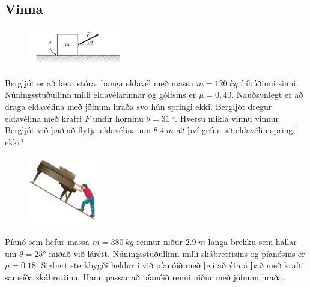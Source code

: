 \begin{enumerate}[label = \textbf{Dæmi \thechapter.\arabic*.}]


\subsection*{Vinna}

\begin{minipage}{\linewidth}
\begin{figure}
\vspace{-0.5cm}
\includegraphics[width=1.7in]{images/beggatwerk.png}
\end{figure}
    
    \item Bergljót er að færa stóra, þunga eldavél með massa $m = \SI{120}{kg}$ í íbúðinni sinni. Núningsstuðullinn milli eldavélarinnar og gólfsins er $\mu = 0,40$. Nauðsynlegt er að draga eldavélina með jöfnum hraða svo hún springi ekki. Bergljót dregur eldavélina með krafti $F$ undir horninu $\theta = \SI{31}{\degree}$. Hversu mikla vinnu vinnur Bergljót við það að flytja eldavélina um $\SI{8,4}{m}$ að því gefnu að eldavélin springi ekki?
    
\end{minipage}
    
\begin{minipage}{\linewidth}
\begin{figure}
\includegraphics[width=1.2in]{images/pianoman.png}
\end{figure}
    
    \item Píanó sem hefur massa $m = \SI{380}{kg}$ rennur  niður $\SI{2.9}{m}$ langa brekku sem hallar um $\theta = \ang{25}$ miðað við lárétt. Núningsstuðullinn milli skábrettisins og píanósins er $\mu = 0.18$. Sigbert sterkbygði heldur í við píanóið með því að ýta á það með krafti samsíða skábrettinu. Hann passar að píanóið renni niður með jöfnum hraða.
    

\end{minipage}
\end{enumerate}
